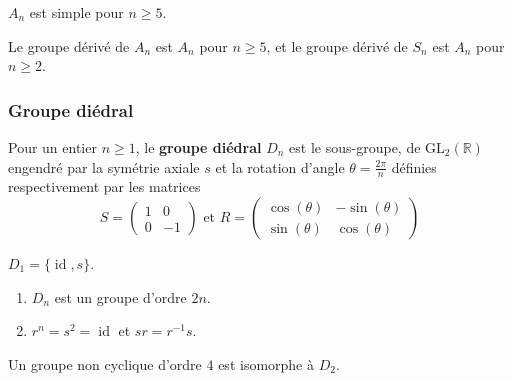 
  \begin{theorem}
    $A_n$ est simple pour $n \geq 5$.
  \end{theorem}

  \begin{corollary}
    Le groupe dérivé de $A_n$ est $A_n$ pour $n \geq 5$, et le groupe dérivé de $S_n$ est $A_n$ pour $n \geq 2$.
  \end{corollary}

  \subsubsection{Groupe diédral}


  \begin{definition}
    Pour un entier $n \geq 1$, le \textbf{groupe diédral} $D_n$ est le sous-groupe, de $\mathrm{GL}_2(\mathbb{R})$ engendré par la symétrie axiale $s$ et la rotation d'angle $\theta = \frac{2\pi}{n}$ définies respectivement par les matrices
    \[
    S =
    \begin{pmatrix}
      1 & 0 \\
      0 & -1
    \end{pmatrix}
    \text{ et }
    R =
    \begin{pmatrix}
      \cos(\theta) & -\sin(\theta) \\
      \sin(\theta) & \cos(\theta)
    \end{pmatrix}
    \]
  \end{definition}

  \begin{example}
    $D_1 = \{ \operatorname{id}, s \}$.
  \end{example}

  \begin{proposition}
    \begin{enumerate}[label={\bfseries(\roman*)}]
      \item $D_n$ est un groupe d'ordre $2n$.
      \item $r^n = s^2 = \operatorname{id}$ et $sr = r^{-1}s$.
    \end{enumerate}
  \end{proposition}


  \begin{proposition}
    Un groupe non cyclique d'ordre $4$ est isomorphe à $D_2$.
  \end{proposition}

